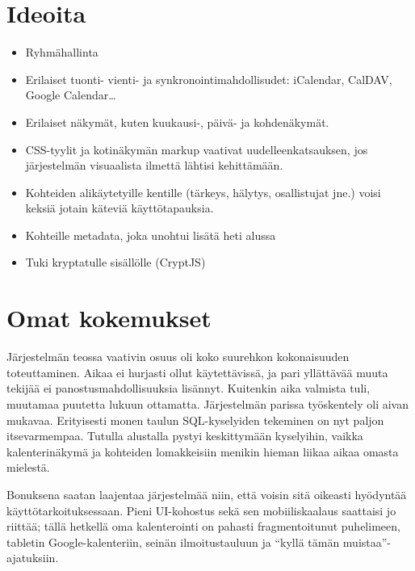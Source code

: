 \documentclass[a4paper,12pt]{report}
\begin{document}
\section*{Ideoita}
\begin{itemize}
      \item Ryhmähallinta
      \item Erilaiset tuonti- vienti- ja synkronointimahdollisudet: iCalendar,
         CalDAV, Google Calendar\dots
      \item Erilaiset näkymät, kuten kuukausi-, päivä- ja kohdenäkymät.
      \item CSS-tyylit ja kotinäkymän markup vaativat uudelleenkatsauksen,
         jos järjestelmän visuaalista ilmettä lähtisi kehittämään.
      \item Kohteiden alikäytetyille kentille (tärkeys, hälytys, osallistujat
         jne.) voisi keksiä jotain käteviä käyttötapauksia.
      \item Kohteille metadata, joka unohtui lisätä heti alussa
       \item Tuki kryptatulle sisällölle (CryptJS)
\end{itemize}

\section*{Omat kokemukset}
Järjestelmän teossa vaativin osuus oli koko suurehkon kokonaisuuden
toteuttaminen. Aikaa ei hurjasti ollut käytettävissä, ja pari yllättävää muuta
tekijää ei panostusmahdollisuuksia lisännyt. Kuitenkin aika valmista tuli,
muutamaa puutetta lukuun ottamatta. Järjestelmän parissa työskentely oli aivan
mukavaa.  Erityisesti monen taulun SQL-kyselyiden tekeminen on nyt paljon
itsevarmempaa.  Tutulla alustalla pystyi keskittymään kyselyihin, vaikka
kalenterinäkymä ja kohteiden lomakkeisiin menikin hieman liikaa aikaa omasta
mielestä.

Bonuksena saatan laajentaa järjestelmää niin, että voisin sitä oikeasti
hyödyntää käyttötarkoituksessaan. Pieni UI-kohostus sekä sen mobiiliskaalaus
saattaisi jo riittää; tällä hetkellä oma kalenterointi on pahasti
fragmentoitunut puhelimeen, tabletin Google-kalenteriin, seinän ilmoitustauluun
ja ``kyllä tämän muistaa''-ajatuksiin.


\end{document}
